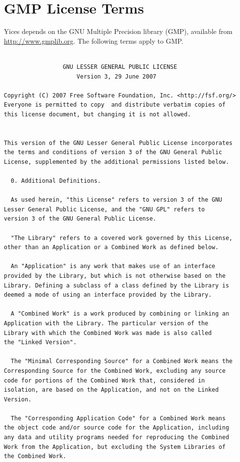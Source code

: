 \documentclass[11pt,twoside,fleqn,openright,titlepage]{cslreport}
\begin{document}
\chapter{GMP License Terms}
\label{gmp-license}

Yices depends on the GNU Multiple Precision library (GMP), available
from \url{http://www.gmplib.org}. The following terms apply to GMP.

\begin{small}
\begin{verbatim}

                 GNU LESSER GENERAL PUBLIC LICENSE
                     Version 3, 29 June 2007

Copyright (C) 2007 Free Software Foundation, Inc. <http://fsf.org/>
Everyone is permitted to copy  and distribute verbatim copies of
this license document, but changing it is not allowed.


This version of the GNU Lesser General Public License incorporates
the terms and conditions of version 3 of the GNU General Public
License, supplemented by the additional permissions listed below.

  0. Additional Definitions.

  As used herein, "this License" refers to version 3 of the GNU 
Lesser General Public License, and the "GNU GPL" refers to 
version 3 of the GNU General Public License.

  "The Library" refers to a covered work governed by this License,
other than an Application or a Combined Work as defined below.

  An "Application" is any work that makes use of an interface
provided by the Library, but which is not otherwise based on the 
Library. Defining a subclass of a class defined by the Library is
deemed a mode of using an interface provided by the Library.

  A "Combined Work" is a work produced by combining or linking an
Application with the Library. The particular version of the
Library with which the Combined Work was made is also called 
the "Linked Version".

  The "Minimal Corresponding Source" for a Combined Work means the
Corresponding Source for the Combined Work, excluding any source
code for portions of the Combined Work that, considered in 
isolation, are based on the Application, and not on the Linked
Version.

  The "Corresponding Application Code" for a Combined Work means 
the object code and/or source code for the Application, including
any data and utility programs needed for reproducing the Combined
Work from the Application, but excluding the System Libraries of
the Combined Work.


\end{verbatim}
\end{small}
\end{document}

